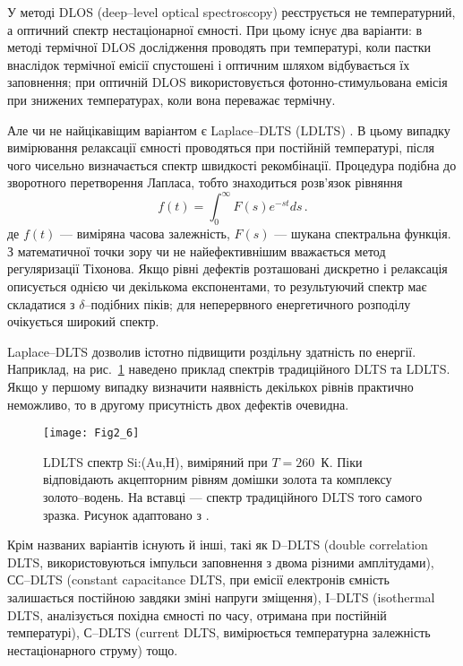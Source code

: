 У методі DLOS (deep--level optical spectroscopy) реєструється не температурний, а оптичний спектр нестаціонарної ємності.
При цьому існує два варіанти:
в методі термічної DLOS дослідження проводять при температурі, коли пастки внаслідок термічної емісії спустошені
і оптичним шляхом відбувається їх заповнення;
при оптичній DLOS використовується фотонно-стимульована емісія при знижених температурах,
коли вона переважає термічну.

Але чи не найцікавіщим варіантом є Laplace--DLTS (LDLTS) \cite{LDLTS2}.
В цьому випадку вимірювання релаксації ємності проводяться при постійній температурі,
після чого чисельно визначається спектр швидкості рекомбінації.
Процедура  подібна до зворотного перетворення Лапласа,
тобто знаходиться розв'язок рівняння
\begin{equation}
\label{DLTSLapl}
f(t)=\int_0^\infty F(s) e^{-st}ds\,.
\end{equation}
де
$f(t)$ --- виміряна часова залежність,
$F(s)$ --- шукана спектральна функція.
З математичної точки зору чи не найефективнішим вважається
метод регуляризації Тіхонова.
Якщо рівні дефектів розташовані дискретно і релаксація описується
однією чи декількома експонентами, то результуючий спектр
має складатися з $\delta$--подібних піків;
для неперервного енергетичного розподілу очікується широкий спектр.

Laplace--DLTS дозволив істотно підвищити роздільну здатність по енергії.
Наприклад, на рис.~\ref{F26} наведено приклад спектрів традиційного DLTS та LDLTS.
Якщо у першому випадку визначити наявність декількох рівнів
практично неможливо, то в другому присутність двох дефектів очевидна.

\begin{figure}[!t]
\center
\vspace{-5mm}
\texttt{[image: Fig2\_6]}
\vspace{-3mm}
\caption{LDLTS спектр Si:(Au,H), виміряний при $T=260$~К.
Піки відповідають акцепторним рівням домішки золота та комплексу
золото--водень.
На вставці --- спектр традиційного DLTS того самого зразка.
Рисунок адаптовано з \cite{Deixler}.
}
\vspace{-3mm}
\label{F26}
\end{figure}

Крім названих варіантів існують й інші, такі як
D--DLTS (double correlation DLTS, використовуються імпульси заповнення з двома різними амплітудами),
СС--DLTS (constant capacitance DLTS, при емісії електронів ємність
залишається постійною завдяки зміні напруги зміщення),
I--DLTS (isothermal DLTS, аналізується похідна ємності по часу, отримана при постійній температурі),
С--DLTS (current DLTS, вимірюється температурна залежність нестаціонарного струму)
тощо.
